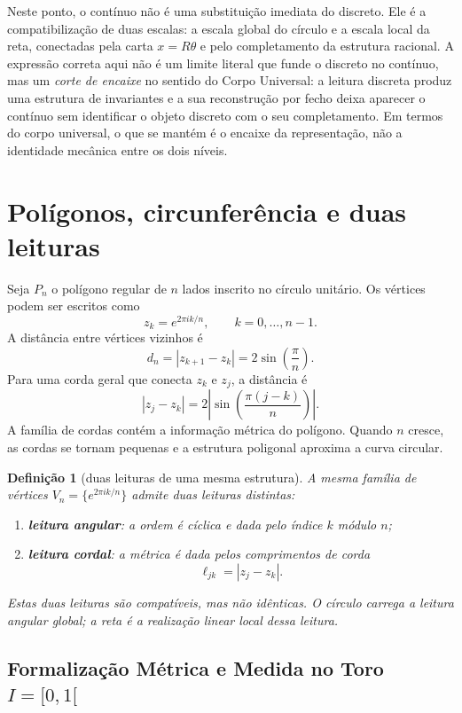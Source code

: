 \documentclass[11pt,a4paper]{article}
\newtheorem{definicao}{Definição}
\begin{document}
Neste ponto, o contínuo não é uma substituição imediata do discreto. Ele é a compatibilização de duas escalas: a escala global do círculo e a escala local da reta, conectadas pela carta $x=R\theta$ e pelo completamento da estrutura racional. A expressão correta aqui não é um limite literal que funde o discreto no contínuo, mas um \emph{corte de encaixe} no sentido do Corpo Universal: a leitura discreta produz uma estrutura de invariantes e a sua reconstrução por fecho deixa aparecer o contínuo sem identificar o objeto discreto com o seu completamento. Em termos do corpo universal, o que se mantém é o encaixe da representação, não a identidade mecânica entre os dois níveis.

\section{Polígonos, circunferência e duas leituras}

Seja $P_n$ o polígono regular de $n$ lados inscrito no círculo unitário. Os vértices podem ser escritos como
\[
 z_k = e^{2\pi i k/n}, \qquad k=0,\dots,n-1.
\]
A distância entre vértices vizinhos é
\[
 d_n = |z_{k+1}-z_k| = 2\sin\left(\frac{\pi}{n}\right).
\]
Para uma corda geral que conecta $z_k$ e $z_j$, a distância é
\[
 |z_j-z_k| = 2\left|\sin\left(\frac{\pi (j-k)}{n}\right)\right|.
\]
A família de cordas contém a informação métrica do polígono. Quando $n$ cresce, as cordas se tornam pequenas e a estrutura poligonal aproxima a curva circular.

\begin{definicao}[duas leituras de uma mesma estrutura]
A mesma família de vértices $V_n=\{e^{2\pi i k/n}\}$ admite duas leituras distintas:

\begin{enumerate}
\item \textbf{leitura angular}: a ordem é cíclica e dada pelo índice $k$ módulo $n$;
\item \textbf{leitura cordal}: a métrica é dada pelos comprimentos de corda
\[
\ell_{jk}=|z_j-z_k|.
\]
\end{enumerate}

Estas duas leituras são compatíveis, mas não idênticas. O círculo carrega a leitura angular global; a reta é a realização linear local dessa leitura.
\end{definicao}

\subsection{Formalização Métrica e Medida no Toro $I=[0,1[$}
\end{document}
